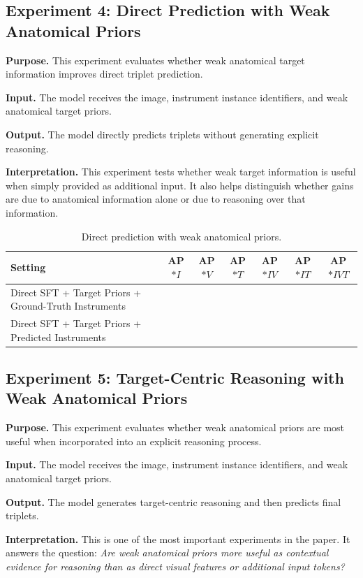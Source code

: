 \documentclass[11pt]{article}
\begin{document}
\subsection{Experiment 4: Direct Prediction with Weak Anatomical Priors}

\textbf{Purpose.}
This experiment evaluates whether weak anatomical target information improves direct triplet prediction.

\textbf{Input.}
The model receives the image, instrument instance identifiers, and weak anatomical target priors.

\textbf{Output.}
The model directly predicts triplets without generating explicit reasoning.

\textbf{Interpretation.}
This experiment tests whether weak target information is useful when simply provided as additional input. It also helps distinguish whether gains are due to anatomical information alone or due to reasoning over that information.

\begin{table}[H]
\centering
\caption{Direct prediction with weak anatomical priors.}
\begin{tabular}{lcccccc}
\toprule
Setting & AP$*I$ & AP$*V$ & AP$*T$ & AP$*{IV}$ & AP$*{IT}$ & AP$*{IVT}$ \\
\midrule
Direct SFT + Target Priors + Ground-Truth Instruments & & & & & & \\
Direct SFT + Target Priors + Predicted Instruments & & & & & & \\
\bottomrule
\end{tabular}
\label{tab:direct_priors}
\end{table}

\subsection{Experiment 5: Target-Centric Reasoning with Weak Anatomical Priors}

\textbf{Purpose.}
This experiment evaluates whether weak anatomical priors are most useful when incorporated into an explicit reasoning process.

\textbf{Input.}
The model receives the image, instrument instance identifiers, and weak anatomical target priors.

\textbf{Output.}
The model generates target-centric reasoning and then predicts final triplets.

\textbf{Interpretation.}
This is one of the most important experiments in the paper. It answers the question: \emph{Are weak anatomical priors more useful as contextual evidence for reasoning than as direct visual features or additional input tokens?}
\end{document}
